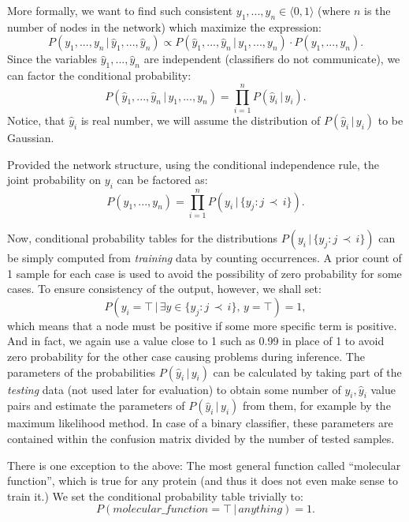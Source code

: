 \documentclass[11pt,twoside,a4paper]{book}
\begin{document}
More formally, we want to find such consistent $y_1, ..., y_n \in \langle 0, 1 \rangle$
(where $n$ is the number of nodes in the network)
which maximize the expression:
\[P(y_1, ..., y_n \,|\, \hat{y}_1, ..., \hat{y}_n) \propto P(\hat{y}_1, ..., \hat{y}_n\, | \, y_1, ..., y_n) \cdot P(y_1, ..., y_n). \]
Since the variables $\hat{y}_1, ..., \hat{y}_n$ are independent (classifiers do not communicate), we can factor the conditional probability:
\[P(\hat{y}_1, ..., \hat{y}_n\, |\, y_1, ..., y_n) = \prod_{i=1}^n P(\hat{y}_i \,|\,y_i). \]
Notice, that $\hat{y}_i$ is real number,
we will assume the distribution of $P(\hat{y}_i\,|\,y_i)$ to be Gaussian.

Provided the network structure, using the conditional independence rule,
the joint probability on $y_i$ can be factored as:
\[ P(y_1, ..., y_n) = \prod_{i=1}^n P(y_i\,|\,\{y_j : j  \,  \prec \,  i\}). \]

Now, conditional probability tables for the distributions $P(y_i\,|\,\{y_j : j  \,  \prec \,  i\})$ 
can be simply computed from \emph{training} data by counting occurrences.
A prior count of 1 sample for each case is used to avoid the 
possibility of zero probability for some cases.
To ensure consistency of the output, however, 
we shall set:
\[ P(y_i = \top \, | \, \exists y \in \{y_j : j  \,  \prec \,  i\}, \, y = \top  ) = 1, \]
which means that a node must be positive if some more specific term is positive.
And in fact, we again use a value close to 1 such as 0.99 in place of 1 to avoid zero probability for the other case causing problems during inference.
The parameters of the probabilities $P(\hat{y}_i\,|\,y_i)$ can be
calculated by taking part of the \emph{testing} data
(not used later for evaluation) to
obtain some number of $y_i, \hat{y}_i$ value pairs and estimate the parameters of $P(\hat{y}_i\,|\,y_i)$ from them,
for example by the maximum likelihood method.
In case of a binary classifier, 
these parameters are contained within the confusion matrix divided 
by the number of tested samples.

There is one exception to the above: 
The most general function called ``molecular function'',
which is true for any protein
(and thus it does not even make sense to train it.)
We set the conditional probability table trivially to:
\[ P(molecular\_function = \top \,|\, anything ) = 1. \]
\end{document}
